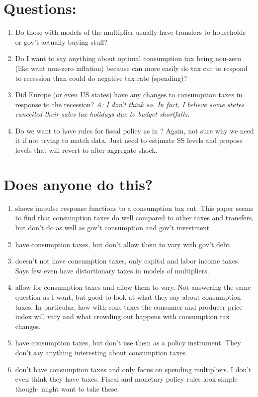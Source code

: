 \documentclass[article,11pt,letterpaper,fleqn]{article}
\theoremstyle{definition}
\numberwithin{equation}{section}
\newcommand{\cn}{\citeasnoun} %
\begin{document}
{\section{Questions:}
\begin{enumerate}
\item Do those with models of the multiplier usually have transfers to households or gov't actually buying stuff?
\item Do I want to say anything about optimal consumption tax being non-zero (like want non-zero inflation) because can more easily do tax cut to respond to recession than could do negative tax rate (spending)?
\item Did Europe (or even US states) have any changes to consumption taxes in response to the recession? \emph{A: I don't think so.  In fact, I believe some states cancelled their sales tax holidays due to budget shortfalls.}
\item Do we want to have rules for fiscal policy as in \cn{Zubairy2010}?  Again, not sure why we need it if not trying to match data.  Just need to estimate SS levels and propose levels that will revert to after aggregate shock.
\end{enumerate}

\section{Does anyone do this?}
\begin{enumerate}
\item \cn{IMF2010} shows impulse response functions to a consumption tax cut.  This paper seems to find that consumption taxes do well compared to other taxes and transfers, but don't do as well as gov't consumption and gov't investment
\item \cn{LPT2010} have consumption taxes, but don't allow them to vary with gov't debt
\item \cn{Zubairy2010} doesn't not have consumption taxes, only capital and labor income taxes.  Says few even have distortionary taxes in models of multipliers.
\item \cn{TY2010} allow for consumption taxes and allow them to vary.  Not answering the same question as I want, but good to look at what they say about consumption taxes.  In particular, how with cons taxes the consumer and producer price index will vary and what crowding out happens with consumption tax changes.
\item \cn{SC2005} have consumption taxes, but don't use them as a policy instrument.  They don't say anything interesting about consumption taxes.
\item \cn{CER2010} don't have consumption taxes and only focus on spending multipliers.  I don't even think they have taxes.  Fiscal and monetary policy rules look simple though- might want to take these.
\end{enumerate}


}
\end{document}
